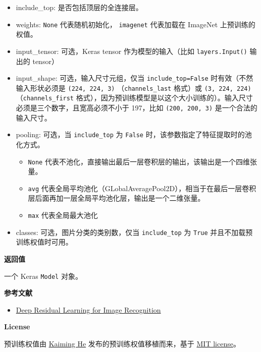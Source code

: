 \begin{itemize}
\tightlist
\item
  include\_top: 是否包括顶层的全连接层。
\item
  weights: \texttt{None} 代表随机初始化，
  \texttt{\textquotesingle{}imagenet\textquotesingle{}} 代表加载在
  ImageNet 上预训练的权值。
\item
  input\_tensor: 可选，Keras tensor 作为模型的输入（比如
  \texttt{layers.Input()} 输出的 tensor）
\item
  input\_shape: 可选，输入尺寸元组，仅当 \texttt{include\_top=False}
  时有效（不然输入形状必须是 \texttt{(224,\ 224,\ 3)}
  （\texttt{channels\_last} 格式）或 \texttt{(3,\ 224,\ 224)}
  （\texttt{channels\_first}
  格式），因为预训练模型是以这个大小训练的）。输入尺寸必须是三个数字，且宽高必须不小于
  197，比如 \texttt{(200,\ 200,\ 3)} 是一个合法的输入尺寸。
\item
  pooling: 可选，当 \texttt{include\_top} 为 \texttt{False}
  时，该参数指定了特征提取时的池化方式。

  \begin{itemize}
  \tightlist
  \item
    \texttt{None}
    代表不池化，直接输出最后一层卷积层的输出，该输出是一个四维张量。
  \item
    \texttt{\textquotesingle{}avg\textquotesingle{}}
    代表全局平均池化（GLobalAveragePool2D），相当于在最后一层卷积层后面再加一层全局平均池化层，输出是一个二维张量。
  \item
    \texttt{\textquotesingle{}max\textquotesingle{}} 代表全局最大池化
  \end{itemize}
\item
  classes: 可选，图片分类的类别数，仅当 \texttt{include\_top} 为
  \texttt{True} 并且不加载预训练权值时可用。
\end{itemize}

\textbf{返回值}\label{ux8fd4ux56deux503c-3}

一个 Keras \texttt{Model} 对象。

\textbf{参考文献}\label{ux53c2ux8003ux6587ux732e-3}

\begin{itemize}
\tightlist
\item
  \href{https://arxiv.org/abs/1512.03385}{Deep Residual Learning for
  Image Recognition}
\end{itemize}

\textbf{License}\label{license-3}

预训练权值由
\href{https://github.com/KaimingHe/deep-residual-networks}{Kaiming He}
发布的预训练权值移植而来，基于
\href{https://github.com/KaimingHe/deep-residual-networks/blob/master/LICENSE}{MIT
license}。



